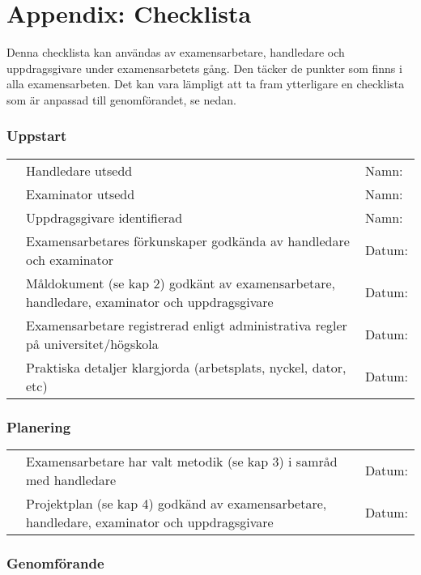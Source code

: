 \section{Appendix: Checklista}\label{appendix-checklista}

Denna checklista kan användas av examensarbetare, handledare och
uppdragsgivare under examensarbetets gång. Den täcker de punkter som
finns i alla examensarbeten. Det kan vara lämpligt att ta fram
ytterligare en checklista som är anpassad till genomförandet, se nedan.

\subsubsection{Uppstart}\label{uppstart}

\begin{longtable}[]{@{}lll@{}}
\toprule
& Handledare utsedd & Namn:\tabularnewline
& Examinator utsedd & Namn:\tabularnewline
& Uppdragsgivare identifierad & Namn:\tabularnewline
& Examensarbetares förkunskaper godkända av handledare och examinator &
Datum:\tabularnewline
& Måldokument (se kap 2) godkänt av examensarbetare, handledare,
examinator och uppdragsgivare & Datum:\tabularnewline
& Examensarbetare registrerad enligt administrativa regler på
universitet/högskola & Datum:\tabularnewline
& Praktiska detaljer klargjorda (arbetsplats, nyckel, dator, etc) &
Datum:\tabularnewline
\bottomrule
\end{longtable}

\subsubsection{}\label{section}

\subsubsection{Planering}\label{planering}

\begin{longtable}[]{@{}lll@{}}
\toprule
& Examensarbetare har valt metodik (se kap 3) i samråd med handledare &
Datum:\tabularnewline
& Projektplan (se kap 4) godkänd av examensarbetare, handledare,
examinator och uppdragsgivare & Datum:\tabularnewline
\bottomrule
\end{longtable}

\subsubsection{Genomförande}\label{genomfuxf6rande}

